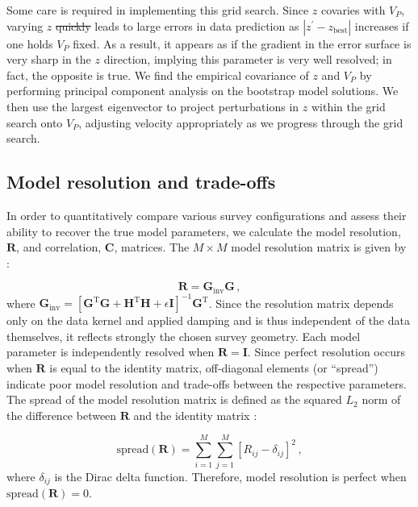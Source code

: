 \documentclass[10pt,titlepage]{article}
\providecommand{\DIFaddtex}[1]{{\protect\color{blue}\uwave{#1}}} %
\providecommand{\DIFdeltex}[1]{{\protect\color{red}\sout{#1}}}                      %
\providecommand{\DIFaddbegin}{} %
\providecommand{\DIFaddend}{} %
\providecommand{\DIFdelbegin}{} %
\providecommand{\DIFdelend}{} %
\providecommand{\DIFadd}[1]{\texorpdfstring{\DIFaddtex{#1}}{#1}} %
\providecommand{\DIFdel}[1]{\texorpdfstring{\DIFdeltex{#1}}{}} %
\begin{document}
Some care is required in implementing this grid search. Since $z$ covaries with $V_P$, varying $z$ \DIFdelbegin \DIFdel{quickly }\DIFdelend \DIFaddbegin \DIFadd{alone }\DIFaddend leads to large errors in data prediction as $|z^{\prime}-z_{{\text{best}}}|$ increases if one holds $V_P$ fixed. As a result, it appears as if the gradient in the error surface is very sharp in the $z$ direction, implying this parameter is very well resolved; in fact, the opposite is true. We find the empirical covariance of $z$ and $V_P$ by performing principal component analysis on the bootstrap model solutions. We then use the largest eigenvector to project perturbations in $z$ within the grid search onto $V_P$, adjusting velocity appropriately as we progress through the grid search. 

\subsection{Model resolution and trade-offs}
In order to quantitatively compare various survey configurations and assess their ability to recover the true model parameters, we calculate the model resolution, $\mathbf{R}$, and correlation, $\mathbf{C}$, matrices. The $M \times M$ model resolution matrix is given by \citep{Menke2018}:

\begin{equation}
\mathbf{R} = \mathbf{G}_{\text{inv}} \mathbf{G} \,,
\end{equation}
where $\mathbf{G}_{\text{inv}}= \left[ \mathbf{G}^{\text{T}} \mathbf{G} + \mathbf{H}^{\text{T}} \mathbf{H} + \epsilon\mathbf{I} \right]^{-1} \mathbf{G}^{\text{T}}$. Since the resolution matrix depends only on the data kernel and applied damping and is thus independent of the data themselves, it reflects strongly the chosen survey geometry. Each model parameter is independently resolved when $\mathbf{R}=\mathbf{I}$. Since perfect resolution occurs when $\mathbf{R}$ is equal to the identity matrix, off-diagonal elements (or ``spread'') indicate poor model resolution and trade-offs between the respective parameters. The spread of the model resolution matrix is defined as the squared $L_2$ norm of the difference between $\mathbf{R}$ and the identity matrix \citep{Menke2018}:

\begin{equation}
\text{spread}(\mathbf{R}) = \sum_{i=1}^M\sum_{j=1}^M \left[ R_{ij}-\delta_{ij}\right]^2 \,,
\end{equation}
where $\delta_{ij}$ is the Dirac delta function. Therefore, model resolution is perfect when $\text{spread}(\mathbf{R})=0$.
\end{document}
